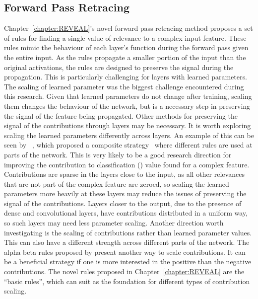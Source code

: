 \subsection{Forward Pass Retracing}
\label{futurectc}
Chapter~\ref{chapter:REVEAL}'s novel forward pass retracing method proposes a set of rules for finding a single value of relevance to a complex input feature. These rules mimic the behaviour of each layer's function during the forward pass given the entire input. As the rules propagate a smaller portion of the input than the original activations, the rules are designed to preserve the signal during the propagation. This is particularly challenging for layers with learned parameters. The scaling of learned parameter was the biggest challenge encountered during this research. Given that learned parameters do not change after training, scaling them changes the behaviour of the network, but is a necessary step in preserving the signal of the feature being propagated. Other methods for preserving the signal of the contributions through layers may be necessary. It is worth exploring scaling the learned parameters differently across layers. An example of this can be seen by \LRP~\cite{bach2015pixel}, which proposed a composite strategy~\cite{SamekBLM17} where different rules are used at parts of the network. This is very likely to be a good research direction for improving the contribution to classification (\CTC\/) value found for a complex feature. Contributions are sparse in the layers close to the input, as all other relevances that are not part of the complex feature are zeroed, so scaling the learned parameters more heavily at these layers may reduce the issues of preserving the signal of the contributions. Layers closer to the output, due to the presence of dense and convolutional layers, have contributions distributed in a uniform way, so such layers may need less parameter scaling. Another direction worth investigating is the scaling of contributions rather than learned parameter values. This can also have a different strength across different parts of the network. The alpha beta rules proposed by \LRP\/ present another way to scale contributions. It can be a beneficial strategy if one is more interested in the positive than the negative contributions. The novel rules proposed in Chapter~\ref{chapter:REVEAL} are the ``basic rules'', which can suit as the foundation for different types of contribution scaling.


